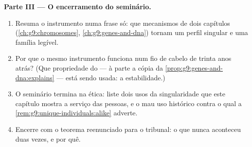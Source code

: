 \begin{problem}
\medskip\noindent\textbf{Parte III --- O encerramento do
seminário.}
\begin{enumerate}[resume]
  \item Resuma o instrumento numa frase só: que mecanismos
        de dois capítulos (\cref{ch:g9:chromosomes},
        \cref{ch:g9:genes-and-dna}) tornam um perfil
        singular e uma família legível.
  \item Por que o mesmo instrumento funciona num fio de
        cabelo de trinta anos atrás? (Que propriedade do 
        --- à parte a cópia da
        \cref{prop:g9:genes-and-dna:explains} --- está sendo
        usada: a estabilidade.)
  \item O seminário termina na ética: liste dois usos da
        singularidade que este capítulo mostra a serviço das
        pessoas, e o mau uso histórico contra o qual a
        \cref{rem:g9:unique-individuals:alike} adverte.
  \item Encerre com o teorema reenunciado para o tribunal: o
        que nunca aconteceu duas vezes, e por quê.
\end{enumerate}
\end{problem}
